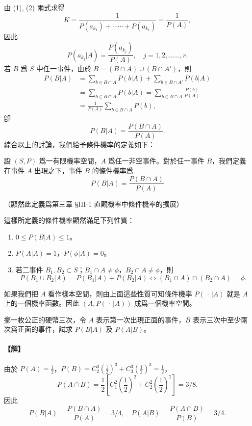 由 (1), (2) 兩式求得
\[
K = \frac{1}{P(a_{k_1}) + \cdots\cdots + P(a_{k_r})} = \frac{1}{P(A)},
\]
因此
\begin{equation}\tag{3}\label{eq:b5-4-3}
P(a_{k_j}|A) = \frac{P(a_{k_j})}{P(A)}, \quad j = 1, 2, \dots\dots, r.
\end{equation}
若 $B$ 爲 $S$ 中任一事件，由於 $B = (B \cap A) \cup (B \cap A')$，則
\begin{align*}
P(B|A) &= \sum_{b \in B \cap A} P(b|A) + \sum_{b \in B \cap A'} P(b|A) \\
&= \sum_{b \in B \cap A} P(b|A) = \sum_{b \in B \cap A} \frac{P(b)}{P(A)} \\
&= \frac{1}{P(A)} \sum_{b \in B \cap A} P(b),
\end{align*}
卽
\[
P(B|A) = \frac{P(B \cap A)}{P(A)}.
\]
綜合以上的討論，我們給予條件機率的定義如下：

\medskip
\begin{definition*}
設 $(S, P)$ 爲一有限機率空間，$A$ 爲任一非空事件。對於任一事件 $B$，我們定義在事件 $A$ 出現之下，事件 $B$ 的條件機率爲
\begin{equation}\tag{4}\label{eq:b5-4-4}
P(B|A) = \frac{P(B \cap A)}{P(A)}
\end{equation}
\end{definition*}
（顯然此定義爲第三章 §III-1 直觀機率中條件機率的擴展）

這樣所定義的條件機率顯然滿足下列性質：
\begin{enumerate}[label=\Roman*., itemsep=2pt, topsep=2pt]
  \item $0 \le P(B|A) \le 1$。
  \item $P(A|A) = 1$，\quad $P(\phi|A) = 0$。
  \item 若二事件 $B_1, B_2 \subset S$；$B_1 \cap A \neq \phi$，$B_2 \cap A \neq \phi$，則
  \[
  P(B_1 \cup B_2|A) = P(B_1|A) + P(B_2|A) \iff (B_1 \cap A) \cap (B_2 \cap A) = \phi.
  \]
\end{enumerate}

如果我們把 $A$ 看作樣本空間，則由上面這些性質可知條件機率 $P(\,\cdot\,|A)$ 就是 $A$ 上的一個機率函數。因此 $(A, P(\,\cdot\,|A))$ 成爲一個機率空間。

\medskip
\begin{example}\label{ex:b5-4-6}
擲一枚公正的硬幣三次，令 $A$ 表示第一次出現正面的事件，$B$ 表示三次中至少兩次爲正面的事件，試求 $P(B|A)$ 及 $P(A|B)$。
\end{example}
\paragraph{【解】}
由於 $P(A) = \frac{1}{2}$，$P(B) = C_2^3 \left(\frac{1}{2}\right)^3 + C_3^3 \left(\frac{1}{2}\right)^3 = \frac{1}{2}$，
\[
P(A \cap B) = \frac{1}{2}\left[ C_1^2 \left(\frac{1}{2}\right)^2 + C_2^2 \left(\frac{1}{2}\right)^2 \right] = 3/8.
\]
因此
\[
P(B|A) = \frac{P(B \cap A)}{P(A)} = 3/4, \quad P(A|B) = \frac{P(A \cap B)}{P(B)} = 3/4. \tag*{\#}
\]

